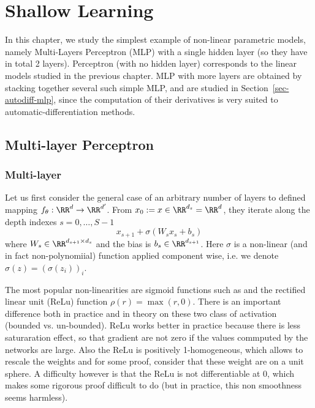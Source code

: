 
\chapter{Shallow Learning}
\label{c-shallow-learning}

In this chapter, we study the simplest example of non-linear parametric models, namely Multi-Layers Perceptron (MLP) with a single hidden layer (so they have in total 2 layers). Perceptron (with no hidden layer) corresponds to the linear models studied in the previous chapter. MLP with more layers are obtained by stacking together several such simple MLP, and are studied in Section~\ref{sec-autodiff-mlp}, since the computation of their derivatives is very suited to automatic-differentiation methods.  


\section{Multi-layer Perceptron}

\subsection{Multi-layer}

Let us first consider the general case of an arbitrary number of layers to defined mapping $f_\theta : \RR^d \to \RR^{d'}$. 
%
From $x_0 := x \in \RR^{d_s} = \RR^d$, they iterate along the depth indexes $s=0,\ldots,S-1$
$$
	x_{s+1} + \sigma( W_s x_s + b_s )
$$
where $W_s \in \RR^{d_{s+1} \times d_s}$ and the bias is $b_s \in \RR^{d_{s+1}}$. 
%
Here $\sigma$ is a non-linear (and in fact non-polynomiial) function applied component wise, i.e. we denote $\sigma(z) = (\sigma(z_i))_i$. 

The most popular non-linearities are sigmoid functions such as
and the rectified linear unit (ReLu) function $\rho(r)=\max(r,0)$. There is an important difference both in practice and in theory on these two class of activation (bounded vs. un-bounded). ReLu works better in practice because there is less saturaration effect, so that gradient are not zero if the values commputed by the networks are large. Also the ReLu is positively 1-homogeneous, which allows to rescale the weights and for some proof, consider that these weight are on a unit sphere. A difficulty however is that the ReLu is not differentiable at 0, which makes some rigorous proof difficult to do (but in practice, this non smoothness seems harmless).

